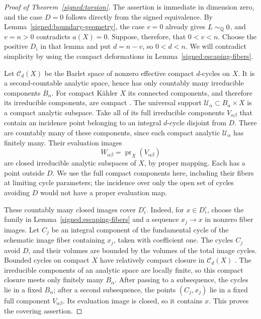 \begin{proof}[Proof of Theorem~\ref{signed:torsion}]
The assertion is immediate in dimension zero, and the case
\(D=0\) follows directly from the signed equivalence.  By
Lemma~\ref{signed:boundary-geometry}, the case \(v=0\)
already gives \(L\sim_{\mathbb Q}0\), and \(v=n>0\) contradicts
\(a(X)=0\).  Suppose, therefore, that \(0<v<n\).  Choose
the positive \(D_i\) in that lemma and put \(d=n-v\), so
\(0<d<n\).  We will contradict simplicity by using the
compact deformations in Lemma~\ref{signed:escaping-fibers}.

Let \(\mathcal C_d(X)\) be the Barlet space of nonzero
effective compact \(d\)-cycles on \(X\).  It is a
second-countable analytic space, hence has only countably
many irreducible components \(B_\alpha\).  For compact
Kähler \(X\) its connected components, and therefore its
irreducible components, are compact
\cite[Theorem~4.5]{Fujiki1978}.  The universal support
\(\mathcal U_\alpha\subset B_\alpha\times X\) is a compact
analytic subspace.  Take all of its full irreducible
components \(V_{\alpha\beta}\) that contain an incidence
point belonging to an integral \(d\)-cycle disjoint from
\(D\).  There are countably many of these components,
since each compact analytic \(\mathcal U_\alpha\) has
finitely many.  Their evaluation images
\[
 W_{\alpha\beta}=\operatorname{pr}_X(V_{\alpha\beta})
\]
are closed irreducible analytic subspaces of \(X\), by
proper mapping.  Each has a point outside \(D\).  We use
the full compact components here, including their fibers
at limiting cycle parameters; the incidence over only the
open set of cycles avoiding \(D\) would not have a proper
evaluation map.

These countably many closed images cover \(D_i^\circ\).
Indeed, for \(x\in D_i^\circ\), choose the family in
Lemma~\ref{signed:escaping-fibers} and a sequence
\(x_j\to x\) in nonzero fiber images.  Let \(C_j\) be an
integral component of the fundamental cycle of the schematic image fiber
containing \(x_j\), taken with coefficient one.  The cycles
\(C_j\) avoid \(D\), and their volumes are bounded by the
volumes of the total image cycles.  Bounded cycles
on compact \(X\) have relatively compact closure in
\(\mathcal C_d(X)\) \cite[Proposition~2.10]{Fujiki1978}.
The irreducible components of an analytic space are locally
finite, so this compact closure meets only finitely many
\(B_\alpha\).  After passing to a subsequence, the cycles
lie in a fixed \(B_\alpha\); after a second subsequence,
the points \((C_j,x_j)\) lie in a fixed full component
\(V_{\alpha\beta}\).  Its evaluation image is closed, so
it contains \(x\).  This proves the covering assertion.


\end{proof}
